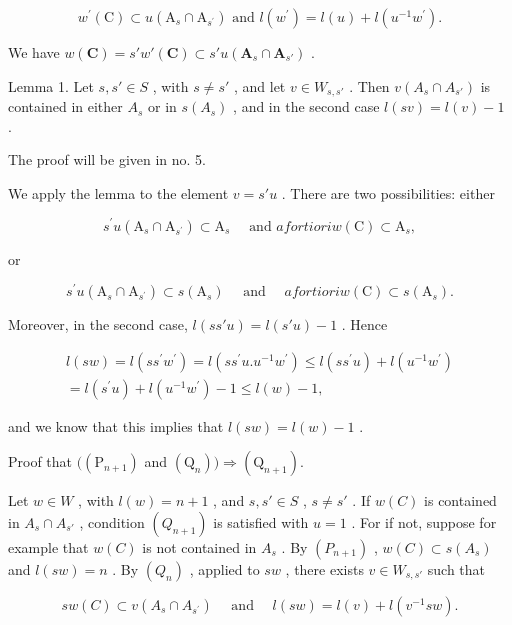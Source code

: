 \[
w ^ {\prime} (\mathrm{C}) \subset u \left(\mathrm{A} _ {s} \cap \mathrm{A} _ {s ^ {\prime}}\right) \text { and } l \left(w ^ {\prime}\right) = l (u) + l \left(u ^ {- 1} w ^ {\prime}\right).
\]

We have \(w(\mathbf{C}) = s'w'(\mathbf{C}) \subset s'u(\mathbf{A}_s \cap \mathbf{A}_{s'})\) .

Lemma 1. Let \(s, s' \in S\) , with \(s \neq s'\) , and let \(v \in W_{s,s'}\) . Then \(v(A_s \cap A_{s'})\) is contained in either \(A_s\) or in \(s(A_s)\) , and in the second case \(l(sv) = l(v) - 1\) .

The proof will be given in no. 5.

We apply the lemma to the element \(v = s'u\) . There are two possibilities: either

\[
  s ^ {\prime} u \left(\mathrm{A} _ {s} \cap \mathrm{A} _ {s ^ {\prime}}\right) \subset \mathrm{A} _ {s} \quad \text { and } a fortiori w (\mathrm{C}) \subset \mathrm{A} _ {s},
\]

or

\[
  s ^ {\prime} u \left(\mathrm{A} _ {s} \cap \mathrm{A} _ {s ^ {\prime}}\right) \subset s \left(\mathrm{A} _ {s}\right) \quad \text { and } \quad a fortiori w (\mathrm{C}) \subset s \left(\mathrm{A} _ {s}\right).
\]

Moreover, in the second case, \(l(ss'u) = l(s'u) - 1\) . Hence

\[
\begin{array}{c} l (s w) = l (s s ^ {\prime} w ^ {\prime}) = l (s s ^ {\prime} u. u ^ {- 1} w ^ {\prime}) \leqslant l (s s ^ {\prime} u) + l (u ^ {- 1} w ^ {\prime}) \\ = l (s ^ {\prime} u) + l (u ^ {- 1} w ^ {\prime}) - 1 \leqslant l (w) - 1, \end{array}
\]

and we know that this implies that \(l(sw) = l(w) - 1\) .

Proof that \(((\mathrm{P}_{n + 1})\) and \((\mathrm{Q}_n))\Longrightarrow (\mathrm{Q}_{n + 1}).\)

Let \(w \in W\) , with \(l(w) = n + 1\) , and \(s, s' \in S\) , \(s \neq s'\) . If \(w(C)\) is contained in \(A_s \cap A_{s'}\) , condition \((Q_{n+1})\) is satisfied with \(u = 1\) . For if not, suppose for example that \(w(C)\) is not contained in \(A_s\) . By \((P_{n+1})\) , \(w(C) \subset s(A_s)\) and \(l(sw) = n\) . By \((Q_n)\) , applied to \(sw\) , there exists \(v \in W_{s,s'}\) such that

\[
s w (C) \subset v \left(A _ {s} \cap A _ {s ^ {\prime}}\right) \quad \text { and } \quad l (s w) = l (v) + l \left(v ^ {- 1} s w\right).
\]

